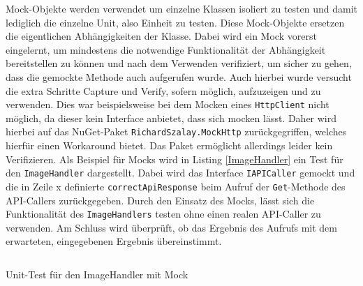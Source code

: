 Mock-Objekte werden verwendet um einzelne Klassen isoliert zu testen und damit lediglich die einzelne Unit, also Einheit zu testen. Diese Mock-Objekte ersetzen die eigentlichen Abhängigkeiten der Klasse. Dabei wird ein Mock vorerst eingelernt, um mindestens die notwendige Funktionalität der Abhängigkeit bereitstellen zu können und nach dem Verwenden verifiziert, um sicher zu gehen, dass die gemockte Methode auch aufgerufen wurde. Auch hierbei wurde versucht die extra Schritte Capture und Verify, sofern möglich, aufzuzeigen und zu verwenden. Dies war beispielsweise bei dem Mocken eines \texttt{HttpClient} nicht möglich, da dieser kein Interface anbietet, dass sich mocken lässt. Daher wird hierbei auf das NuGet-Paket \texttt{RichardSzalay.MockHttp} zurückgegriffen, welches hierfür einen Workaround bietet. Das Paket ermöglicht allerdings leider kein Verifizieren. Als Beispiel für Mocks wird in Listing \ref{ImageHandler} ein Test für den \texttt{ImageHandler} dargestellt. Dabei wird das Interface \texttt{IAPICaller} gemockt und die in Zeile x definierte \texttt{correctApiResponse} beim Aufruf der \texttt{Get}-Methode des API-Callers zurückgegeben. Durch den Einsatz des Mocks, lässt sich die Funktionalität des \texttt{ImageHandlers} testen ohne einen realen API-Caller zu verwenden. Am Schluss wird überprüft, ob das Ergebnis des Aufrufs mit dem erwarteten, eingegebenen Ergebnis übereinstimmt.

\begin{listing}[h]
\inputminted[linenos=true,frame=lines]{csharp}{Listings/ImageHandlerTest.cs}
\caption{Unit-Test für den ImageHandler mit Mock}
\label{ImageHandler}
\end{listing}

